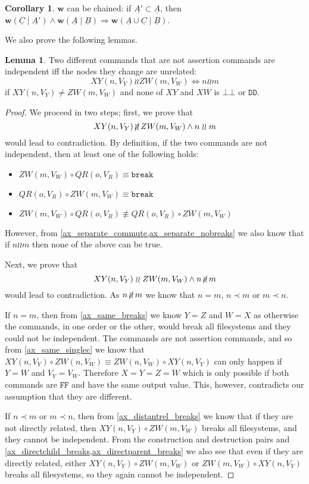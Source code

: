 \documentclass[12pt]{article}
\newcommand{\empt}{\bot}
\newcommand{\cbrk}{\mathtt{break}} %
\newcommand{\fscommand}[2]{{#1#2}}
\newcommand{\fsregcommandchar}[1]{\mathtt{#1}}
\newcommand{\fsregcommand}[2]{\fscommand{\fsregcommandchar{#1}}{\fsregcommandchar{#2}}}
\newcommand{\cbb}{\fsregcommand{\empt}{\empt}}
\newcommand{\cff}{\fsregcommand{F}{F}}
\newcommand{\cdd}{\fsregcommand{D}{D}}
\newcommand{\cxy}{\fscommand{X}{Y}}
\newcommand{\cxw}{\fscommand{X}{W}}
\newcommand{\czw}{\fscommand{Z}{W}}
\newcommand{\cqr}{\fscommand{Q}{R}}
\newcommand{\cc}{\circ} %
\newcommand{\descendant}{\prec}
\newcommand{\nequiv}{\not\equiv}
\newcommand{\indep}{\mathrel{\wr\wr}} %
\newcommand{\unrel}{\indep} %
\newcommand{\nindep}{\,{\centernot{\wr\wr}}\,} %
\newcommand{\nunrel}{\nindep} %
\newcommand{\workssign}{\mathbf{w}}
\newcommand{\worksc}[2]{\workssign({#1}\mathrel{|}{#2})}
\newcommand{\seqset}[1]{\underline{#1}} %
\theoremstyle{definition}
\newtheorem{mylem}{Lemma}
\newtheorem{mycor}{Corollary}
\begin{document}
\begin{mycor}\label{workschained}
$\workssign$ can be chained:
if $\seqset{A'}\subset\seqset{A}$, then
$ \worksc{\seqset{C}}{\seqset{A'}} \wedge \worksc{\seqset{A}}{\seqset{B}} \Rightarrow \worksc{\seqset{A}\cup\seqset{C}}{\seqset{B}}$.
\end{mycor}

We also prove the following lemmas.

\begin{mylem}\label{unrelated_is_independent}
Two different commands that are not assertion commands are independent iff the nodes they change are unrelated:
\[ \cxy(n,V_Y)\indep\czw(m,V_W) \Leftrightarrow n\unrel m \]
if $\cxy(n,V_Y)\neq\czw(m,V_W)$ and none of $\cxy$ and $\cxw$ is $\cbb$ or $\cdd$.
\end{mylem}
\begin{proof}
We proceed in two steps; first, we prove that
\[ \cxy(n,V_Y)\nindep\czw(m,V_W) \wedge n\unrel m \] would lead to contradiction.
By definition, if the two commands are not independent, then at least one of the following holds:
\begin{itemize}
\item $\czw(m,V_W)\cc \cqr(o,V_R) \equiv\cbrk$
\item $\cqr(o,V_R)\cc \czw(m,V_W) \equiv\cbrk$
\item $\czw(m,V_W)\cc \cqr(o,V_R) \nequiv \cqr(o,V_R)\cc \czw(m,V_W)$
\end{itemize}
However, from \cref{ax_separate_commute,ax_separate_nobreaks} we also know that
if $n\unrel m$ then none of the above can be true.

Next, we prove that
\[ \cxy(n,V_Y)\indep\czw(m,V_W) \wedge n\nunrel m \] would lead to contradiction.
As $n\nunrel m$
we know that $n=m$, $n\descendant m$ or $m\descendant n$.

If $n=m$, then from \cref{ax_same_breaks} we know $Y=Z$ and $W=X$
as otherwise the commands, in one order or the other, would break all filesystems
and they could not be independent.
The commands are not assertion commands, and so from \cref{ax_same_singlec}
we know that $\cxy(n,V_Y)\cc\czw(n,V_W)\equiv\czw(n,V_W)\cc\cxy(n,V_Y)$ can only happen if $Y=W$ and $V_Y=V_W$.
Therefore $X=Y=Z=W$ which is only possible if both commands are $\cff$ and have the same
output value. This, however, contradicts our assumption that they are different.

If $n\descendant m$ or $m\descendant n$, then
from \cref{ax_distantrel_breaks} we know that if they are not directly related,
then $\cxy(n,V_Y)\cc\czw(m,V_W)$ breaks all filesystems, and they cannot be independent.
From the construction and destruction pairs and 
\cref{ax_directchild_breaks,ax_directparent_breaks} we also see that
even if they are directly related, either
$\cxy(n,V_Y)\cc\czw(m,V_W)$ or $\czw(m,V_W)\cc\cxy(n,V_Y)$ 
breaks all filesystems, so they again cannot be independent.
\end{proof}
\end{document}

